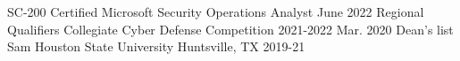 \begin{cvhonors}
  \cvhonor
    {SC-200} %
    {Certified Microsoft Security Operations Analyst} %
    {} %
    {June 2022} %
  \cvhonor
    {Regional Qualifiers} %
    {Collegiate Cyber Defense Competition} %
    {2021-2022} %
    {Mar. 2020}
  \cvhonor
    {Dean's list}
    {Sam Houston State University}
    {Huntsville, TX}
    {2019-21}
  
\end{cvhonors}
